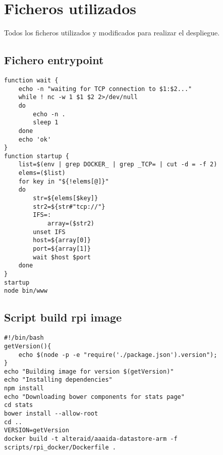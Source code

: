 \chapter{Ficheros utilizados}

Todos los ficheros utilizados y modificados para realizar el despliegue. 

\section{Fichero entrypoint}
\begin{verbatim}
function wait {
    echo -n "waiting for TCP connection to $1:$2..."
    while ! nc -w 1 $1 $2 2>/dev/null
    do
        echo -n .
        sleep 1
    done
    echo 'ok'
}
function startup {
    list=$(env | grep DOCKER_ | grep _TCP= | cut -d = -f 2)
    elems=($list)
    for key in "${!elems[@]}"
    do
        str=${elems[$key]}
        str2=${str#"tcp://"}
        IFS=:
            array=($str2)
        unset IFS
        host=${array[0]}
        port=${array[1]}
        wait $host $port
    done
}
startup
node bin/www
\end{verbatim}

\section{Script build rpi image}
\begin{verbatim}
#!/bin/bash
getVersion(){
    echo $(node -p -e "require('./package.json').version");
}
echo "Building image for version $(getVersion)"
echo "Installing dependencies"
npm install
echo "Downloading bower components for stats page"
cd stats
bower install --allow-root
cd ..
VERSION=getVersion
docker build -t alteraid/aaaida-datastore-arm -f scripts/rpi_docker/Dockerfile .
\end{verbatim}

